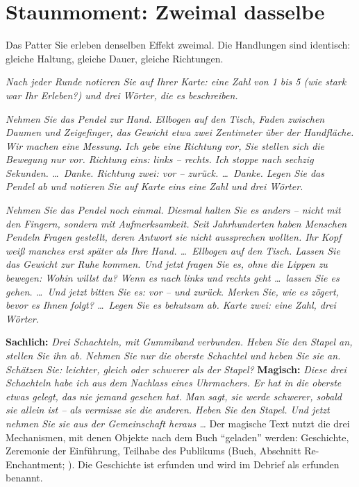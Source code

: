 \section{Staunmoment: Zweimal dasselbe}
\begin{staunbox}{Das Patter}
Sie erleben denselben Effekt zweimal. Die Handlungen sind identisch:
gleiche Haltung, gleiche Dauer, gleiche Richtungen.

\emph{Nach jeder Runde notieren Sie auf Ihrer Karte: eine Zahl von 1 bis
5 (wie stark war Ihr Erleben?) und drei Wörter, die es beschreiben.}
\end{staunbox}
\os{\newpage}

\begin{lehrhinweis}
\itshape
Nehmen Sie das Pendel zur Hand. Ellbogen auf den Tisch, Faden zwischen
Daumen und Zeigefinger, das Gewicht etwa zwei Zentimeter über der
Handfläche. Wir machen eine Messung. Ich gebe eine Richtung vor, Sie
stellen sich die Bewegung nur vor. Richtung eins: links -- rechts. Ich
stoppe nach sechzig Sekunden. \dots\ Danke. Richtung zwei: vor --
zurück. \dots\ Danke. Legen Sie das Pendel ab und notieren Sie auf Karte
eins eine Zahl und drei Wörter.
\end{lehrhinweis}

\begin{lehrhinweis}
\itshape
Nehmen Sie das Pendel noch einmal. Diesmal halten Sie es anders -- nicht
mit den Fingern, sondern mit Aufmerksamkeit. Seit Jahrhunderten haben
Menschen Pendeln Fragen gestellt, deren Antwort sie nicht aussprechen
wollten. Ihr Kopf weiß manches erst später als Ihre Hand. \dots\
Ellbogen auf den Tisch. Lassen Sie das Gewicht zur Ruhe kommen. Und jetzt
fragen Sie es, ohne die Lippen zu bewegen: Wohin willst du? Wenn es nach
links und rechts geht \dots\ lassen Sie es gehen. \dots\ Und jetzt bitten
Sie es: vor -- und zurück. Merken Sie, wie es zögert, bevor es Ihnen
folgt? \dots\ Legen Sie es behutsam ab. Karte zwei: eine Zahl, drei Wörter.
\end{lehrhinweis}

\begin{lehrhinweis}
\textbf{Sachlich:} \emph{Drei Schachteln, mit Gummiband verbunden. Heben
Sie den Stapel an, stellen Sie ihn ab. Nehmen Sie nur die oberste
Schachtel und heben Sie sie an. Schätzen Sie: leichter, gleich oder
schwerer als der Stapel?} \textbf{Magisch:} \emph{Diese drei Schachteln
habe ich aus dem Nachlass eines Uhrmachers. Er hat in die oberste etwas
gelegt, das nie jemand gesehen hat. Man sagt, sie werde schwerer, sobald
sie allein ist -- als vermisse sie die anderen. Heben Sie den Stapel. Und
jetzt nehmen Sie sie aus der Gemeinschaft heraus \dots} Der magische Text
nutzt die drei Mechanismen, mit denen Objekte nach dem Buch
\enquote{geladen} werden: Geschichte, Zeremonie der Einführung, Teilhabe
des Publikums (Buch, Abschnitt Re-Enchantment; \textcite{taylor2020bizarre}).
Die Geschichte ist erfunden und wird im Debrief als erfunden benannt.
\end{lehrhinweis}

